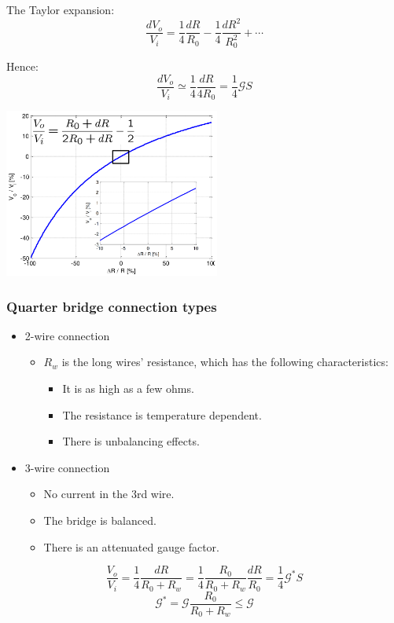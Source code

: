 \documentclass[11pt]{article}
\begin{document}
The Taylor expansion:
\[\frac{dV_o}{V_i} = \frac{1}{4} \frac{dR}{R_0} - \frac{1}{4} \frac{dR^2}{R_0^2} + \cdots\]

Hence:
\[\frac{dV_o}{V_i} \simeq \frac{1}{4} \frac{dR}{4R_0} = \frac{1}{4} \mathcal{G} S\]

\begin{center}
\includegraphics[height=15em]{./images/quarter-bridge-graph.png}
\end{center}
\subsubsection{Quarter bridge connection types}
\label{sec:orgc8787a4}
\begin{itemize}
\item 2-wire connection
\begin{itemize}
\item \(R_w\) is the long wires' resistance, which has the following characteristics:
\begin{itemize}
\item It is as high as a few ohms.
\item The resistance is temperature dependent.
\item There is unbalancing effects.
\end{itemize}
\end{itemize}
\item 3-wire connection
\begin{itemize}
\item No current in the 3rd wire.
\item The bridge is balanced.
\item There is an attenuated gauge factor.
\end{itemize}
\end{itemize}

\[\frac{V_o}{V_i} = \frac{1}{4} \frac{dR}{R_0 + R_w} = \frac{1}{4} \frac{R_0}{R_0 + R_w} \frac{dR}{R_0} = \frac{1}{4} \mathcal{G}^* S\]
\[\mathcal{G}^* = \mathcal{G} \frac{R_0}{R_0 + R_w} \le \mathcal{G}\]
\end{document}
